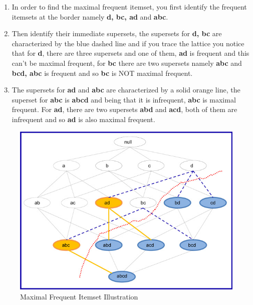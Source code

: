 \begin{enumerate}
\item In order to find the maximal frequent itemset, you first identify the frequent itemsets at the border namely \textbf{d, bc, ad} and \textbf{abc}.
\item Then identify their immediate supersets,
the supersets for \textbf{d, bc} are characterized by the blue dashed line and if you trace the lattice you notice that for \textbf{d}, there are three supersets and one of them, \textbf{ad} is frequent and this can’t be maximal frequent,
for \textbf{bc} there are two supersets namely \textbf{abc} and \textbf{bcd, abc} is frequent and so \textbf{bc} is NOT maximal frequent.
\item The supersets for \textbf{ad} and \textbf{abc} are characterized by a solid orange line, the superset for \textbf{abc} is \textbf{abcd} and being that it is infrequent, \textbf{abc} is maximal frequent. For \textbf{ad}, there are two supersets \textbf{abd} and \textbf{acd}, both of them are infrequent and so \textbf{ad} is also maximal frequent.
\end{enumerate}

\begin{figure}
  \centering
  \includegraphics[width=\linewidth]{figures/maxFISExample}
  \caption{Maximal Frequent Itemset Illustration}
  \label{fig:maxFISExample}
\end{figure}


